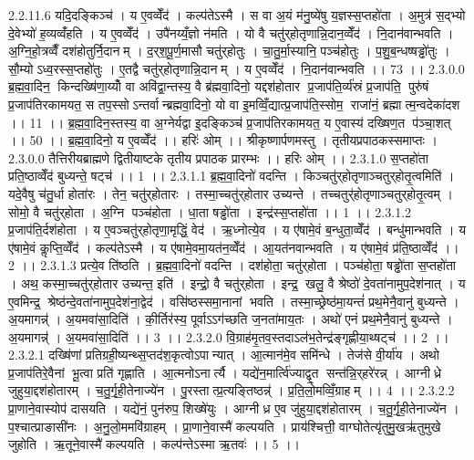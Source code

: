 2.2.11.6
यदि॒दङ्किञ्च॑ । य ए॒वव्वेँद॑ । कल्प॑तेऽस्मै । स वा अ॒यं म॑नु॒ष्ये॑षु य॒ज्ञस्स॒प्तहो॑ता । अ॒मुत्र॑ स॒द्भ्यो दे॒वेभ्यो॑ ह॒व्यव्वँ॑हति । य ए॒वव्वेँद॑ । उपै॑नय्यँ॒ज्ञो न॑मति । यो वै चतु॑र्‌होतृणान्नि॒दान॒व्वेँद॑ । नि॒दान॑वान्भवति । अ॒ग्नि॒हो॒त्रव्वैँ दश॑होतुर्नि॒दानम् । द॒र्‌श॒पू॒र्ण॒मासौ चतु॑र्‌होतुः । चा॒तु॒र्मा॒स्यानि॒ पञ्च॑होतुः । प॒शु॒ब॒न्धष्षड्ढो॑तुः । सौ॒म्योऽध्व॒रस्स॒प्तहो॑तुः । ए॒तद्वै चतु॑र्‌होतृणान्नि॒दानम् । य ए॒वव्वेँद॑ । नि॒दान॑वान्भवति ।। 73 ।।
2.3.0.0
ब्र॒ह्म॒वा॒दिन॒ किन्दख्षि॑णा॒य्योँ वा अवि॑द्वा॒न्तस्य॒ वै ब्र॑ह्मवा॒दिनो॒ यद्दश॑होतार प्र॒जाप॑ति॒र्व्य॑स्रं प्र॒जाप॑ति॒ पुरु॑षं प्र॒जाप॑तिरकामयत॒ स तप॒स्सोऽन्तर्वान्ब्रह्मवा॒दिनो॒ यो वा इ॒मव्विँ॒द्यात्प्र॒जाप॑ति॒स्सोम॒॒ राजा॑नं॒ ब्रह्मात्म॒न्वदेका॑दश ।। 11 ।। ब्र॒ह्म॒वा॒दिन॒स्तस्य॒ वा अ॒ग्नेर्यद्वा इ॒दङ्किञ्च॑ प्र॒जाप॑तिरकामयत॒ य ए॒वास्य॑ दख्षिण॒त प॑ञ्चा॒शत् ।। 50 ।। ब्र॒ह्म॒वा॒दिनो॒ य ए॒वव्वेँद॑ ।। हरिः॑ ओम् ।। श्रीकृष्णार्पणमस्तु । तृतीयप्रपाठकस्समाप्तः ।
2.3.0.0
तैत्तिरीयब्राह्मणे द्वितीयाष्टके तृतीय प्रपाठक प्रारम्भः ।। हरिः ओम् ।।
2.3.1.0
स॒प्तहो॑ता प्रति॒ष्ठाव्वेँद॑ बुध्यन्ते॒ षट्च॑ ।। 1 ।।
2.3.1.1
ब्र॒ह्म॒वा॒दिनो॑ वदन्ति । किञ्चतु॑र्‌होतृणाञ्चतुर्‌होतृ॒त्वमिति॑ । यदे॒वैषु च॑तु॒र्धा होता॑रः । तेन॒ चतु॑र्‌होतारः । तस्मा॒च्चतु॑र्‌होतार उच्यन्ते । तच्चतुर्॑होतृणाञ्चतुर्‌होतृ॒त्वम् । सोमो॒ वै चतु॑र्‌होता । अ॒ग्नि पञ्च॑होता । धा॒ता षड्ढो॑ता । इन्द्र॑स्स॒प्तहो॑ता ।। 1 ।।
2.3.1.2
प्र॒जाप॑ति॒र्दश॑होता । य ए॒वञ्चतु॑र्‌होतृणा॒मृद्धिं॒ वेद॑ । ऋ॒ध्नोत्ये॒व । य ए॑षामे॒वं ब॒न्धुता॒व्वेँद॑ । बन्धु॑मान्भवति । य ए॑षामे॒वं कॢप्ति॒व्वेँद॑ । कल्प॑तेऽस्मै । य ए॑षामे॒वमा॒यत॑न॒व्वेँद॑ । आ॒यत॑नवान्भवति । य ए॑षामे॒वं प्र॑ति॒ष्ठाव्वेँद॑ ।। 2 ।।
2.3.1.3
प्रत्ये॒व ति॑ष्ठति । ब्र॒ह्म॒वा॒दिनो॑ वदन्ति । दश॑होता॒ चतु॑र्‌होता । पञ्च॑होता॒ षड्ढो॑ता स॒प्तहो॑ता । अथ॒ कस्मा॒च्चतु॑र्‌होतार उच्यन्त॒ इति॑ । इन्द्रो॒ वै चतु॑र्‌होता । इन्द्र॒ खलु॒ वै श्रेष्ठो॑ दे॒वता॑नामुप॒देश॑नात् । य ए॒वमिन्द्र॒॒ श्रेष्ठ॑न्दे॒वता॑नामुप॒देश॑ना॒द्वेद॑ । वसि॑ष्ठस्समा॒नानां भवति । तस्मा॒च्छ्रेष्ठ॑मा॒यन्तं॑ प्रथ॒मेनै॒वानु॑ बुध्यन्ते । अ॒यमागन्न्॑ । अ॒यमवा॑सा॒दिति॑ । की॒र्तिर॑स्य॒ पूर्वाऽऽग॑च्छति ज॒नता॑माय॒तः । अथो॑ एनं प्रथ॒मेनै॒वानु॑ बुध्यन्ते । अ॒यमागन्न्॑ । अ॒यमवा॑सा॒दिति॑ ।। 3 ।।
2.3.2.0
वि॒ग्राह॑मृ॒तव॒स्तदाऽल॑भ॒तेन्द्र॑ङ्गृह्णीया॒थ्षट्च॑ ।। 2 ।।
2.3.2.1
दख्षि॑णां प्रतिग्रही॒ष्यन्थ्स॒प्तद॑श॒कृत्वोऽपान्यात् । आ॒त्मान॑मे॒व समि॑न्धे । तेज॑से वी॒र्या॑य । अथो प्र॒जाप॑तिरे॒वैनां भू॒त्वा प्रति॑ गृह्णाति । आ॒त्मनोऽनार्त्यै । यद्ये॑न॒मार्त्वि॑ज्याद्वृ॒त सन्त॑न्नि॒र्‌हरे॑रन्न् । आग्नीध्रे जुहुया॒द्दश॑होतारम् । च॒तु॒र्गृ॒ही॒तेनाज्ये॑न । पु॒रस्तात्प्र॒त्यङ्तिष्ठन्न्॑ । प्र॒ति॒लो॒मव्विँ॒ग्राहम् ।। 4 ।।
2.3.2.2
प्रा॒णाने॒वास्योप॑ दासयति । यद्ये॑नं॒ पुन॑रुप॒ शिख्षे॑युः । आग्नीध्र ए॒व जु॑हुया॒द्दश॑होतारम् । च॒तु॒र्गृ॒ही॒तेनाज्ये॑न । प॒श्चात्प्राङासी॑नः । अ॒नु॒लो॒ममवि॑ग्राहम् । प्रा॒णाने॒वास्मै॑ कल्पयति । प्राय॑श्चित्ती॒ वाग्घोतेत्यृ॑तुमु॒खऋ॑तुमुखे जुहोति । ऋ॒तूने॒वास्मै॑ कल्पयति । कल्प॑न्तेऽस्मा ऋ॒तवः॑ ।। 5 ।।
